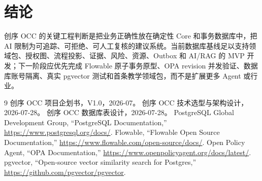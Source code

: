 \documentclass[journal,a4paper,onecolumn]{IEEEtran}
\begin{document}
\section{结论}
创序 OCC 的关键工程判断是把业务正确性放在确定性 Core 和事务数据库中，把 AI 限制为可追踪、可拒绝、可人工复核的建议系统。当前数据库基线足以支持领域包、授权图、流程投影、证据、风险、资源、Outbox 和 AI/RAG 的 MVP 开发；下一阶段应优先完成 Flowable 原子事务原型、OPA revision 并发验证、数据库账号隔离、真实 pgvector 测试和首条教学领域包，而不是扩展更多 Agent 或行业。

\begin{thebibliography}{9}
 创序 OCC 项目企划书，V1.0，2026-07。
 创序 OCC 技术选型与架构设计，2026-07-28。
 创序 OCC 数据库表设计，2026-07-28。
 PostgreSQL Global Development Group, ``PostgreSQL Documentation,'' \url{https://www.postgresql.org/docs/}.
 Flowable, ``Flowable Open Source Documentation,'' \url{https://www.flowable.com/open-source/docs/}.
 Open Policy Agent, ``OPA Documentation,'' \url{https://www.openpolicyagent.org/docs/latest/}.
 pgvector, ``Open-source vector similarity search for Postgres,'' \url{https://github.com/pgvector/pgvector}.
\end{thebibliography}
\end{document}
